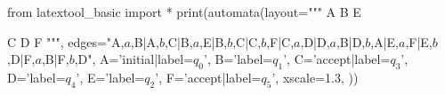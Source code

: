 from latextool_basic import *
print(automata(layout="""
A  B  E

C  D  F
""",
edges="A,$a$,B|A,$b$,C|B,$a$,E|B,$b$,C|C,$b$,F|C,$a$,D|D,$a$,B|D,$b$,A|E,$a$,F|E,$b$,D|F,$a$,B|F,$b$,D",
A='initial|label=$q_0$',
B='label=$q_1$',
C='accept|label=$q_3$',
D='label=$q_4$',
E='label=$q_2$',
F='accept|label=$q_5$', xscale=1.3,
))
